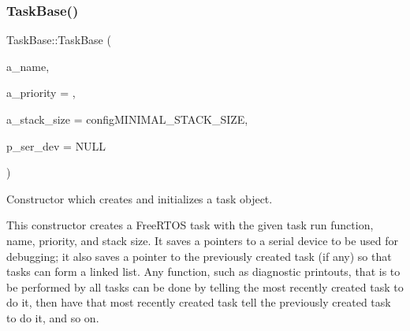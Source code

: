 \subsubsection{\texorpdfstring{Task\+Base()}{TaskBase()}}
{\footnotesize\ttfamily Task\+Base\+::\+Task\+Base (\begin{DoxyParamCaption}\item[{const char $\ast$}]{a\+\_\+name,  }\item[{unsigned port\+B\+A\+S\+E\+\_\+\+T\+Y\+PE}]{a\+\_\+priority = {},  }\item[{size\+\_\+t}]{a\+\_\+stack\+\_\+size = {\ttfamily configMINIMAL\+\_\+STACK\+\_\+SIZE},  }\item[{\mbox{\hyperlink{classemstream}{emstream}} $\ast$}]{p\+\_\+ser\+\_\+dev = {\ttfamily NULL} }\end{DoxyParamCaption})\hspace{0.3cm}{\ttfamily [explicit]}}



Constructor which creates and initializes a task object. 

This constructor creates a Free\+R\+T\+OS task with the given task run function, name, priority, and stack size. It saves a pointers to a serial device to be used for debugging; it also saves a pointer to the previously created task (if any) so that tasks can form a linked list. Any function, such as diagnostic printouts, that is to be performed by all tasks can be done by telling the most recently created task to do it, then have that most recently created task tell the previously created task to do it, and so on.

